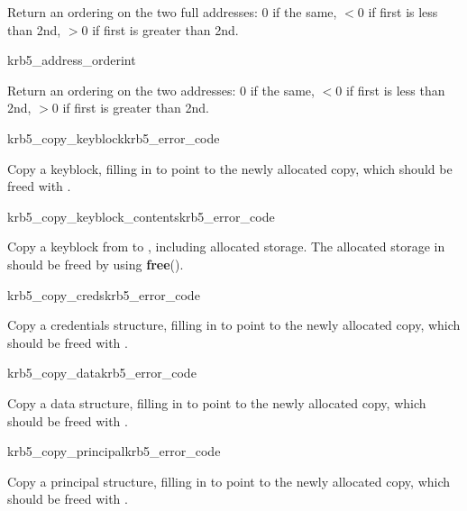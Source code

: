Return an ordering on the two full addresses:  0 if the same,
$< 0$ if first is less than 2nd, $> 0$ if first is greater than 2nd.

\begin{funcdecl}{krb5_address_order}{int}{\funcin}
\end{funcdecl}

Return an ordering on the two addresses:  0 if the same,
$< 0$ if first is less than 2nd, $> 0$ if first is greater than 2nd.

\begin{funcdecl}{krb5_copy_keyblock}{krb5_error_code}{\funcin}
\funcout
{}
\end{funcdecl}

Copy a keyblock, filling in  to point to the newly
allocated copy, which should be freed with
. 

\begin{funcdecl}{krb5_copy_keyblock_contents}{krb5_error_code}{\funcin}
\funcout
{}
\end{funcdecl}

Copy a keyblock from  to , including
allocated storage.  The allocated storage in  should be
freed by using {\bf free}().

\begin{funcdecl}{krb5_copy_creds}{krb5_error_code}{\funcin}
\funcout
{}
\end{funcdecl}

Copy a credentials structure, filling in  to point
to the newly allocated copy, which should be freed with
.

\begin{funcdecl}{krb5_copy_data}{krb5_error_code}{\funcin}
\funcout
{}
\end{funcdecl}

Copy a data structure, filling in  to point to the
newly allocated copy, which should be freed with .

\begin{funcdecl}{krb5_copy_principal}{krb5_error_code}{\funcin}
\funcout
{}
\end{funcdecl}
Copy a principal structure, filling in  to point to
the newly allocated copy, which should be freed with
.

